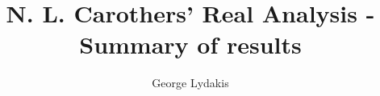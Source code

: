 \documentclass[a4paper, 11pt]{book}
\begin{document}
\title{N. L. Carothers' Real Analysis - Summary of results}
\author{George Lydakis}
\maketitle

\setcounter{tocdepth}{2}
\tableofcontents


%
%


\end{document}

